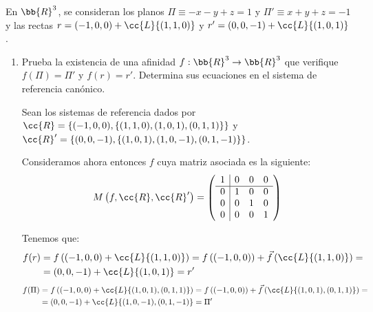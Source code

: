 \documentclass[12pt]{article}
\begin{document}
    \begin{ejercicio}[2.5 puntos]
        En $\bb{R}^3$, se consideran los planos $\Pi\equiv -x-y+z=1$ y $\Pi'\equiv x+y+z=-1$
        y las rectas $r=(-1,0,0) + \cc{L}\{(1,1,0)\}$ y $r'=(0,0,-1) + \cc{L}\{(1,0,1)\}$.
        \begin{enumerate}
            \item Prueba la existencia de una afinidad $f:\bb{R}^3 \to \bb{R}^3$ que verifique $f(\Pi)=\Pi'$ y $f(r)=r'$.
            Determina sus ecuaciones en el sistema de referencia canónico.

            Sean los sistemas de referencia dados por $\cc{R}=\{(-1,0,0), \{(1,1,0), (1,0,1), (0,1,1)\}\}$
            y $\cc{R}'=\{(0,0,-1), \{(1,0,1), (1,0,-1), (0,1,-1)\}\}$.

            Consideramos ahora entonces $f$ cuya matriz asociada es la siguiente:
            \begin{equation*}
                M\left(f, \cc{R}, \cc{R}'\right) = \left(
                    \begin{array}{c|ccc}
                        1 & 0 & 0 & 0 \\
                        \hline
                        0 & 1 & 0 & 0 \\
                        0 & 0 & 1 & 0 \\
                        0 & 0 & 0 & 1
                    \end{array}
                \right)
            \end{equation*}

            Tenemos que:
            \begin{align*}
                f(r)&
                = f\left((-1,0,0) + \cc{L}\{(1,1,0)\}\right)
                = f\left((-1,0,0)\right) + \vec{f}\left(\cc{L}\{(1,1,0)\}\right)
                =\\&= (0,0,-1) + \cc{L}\{(1,0,1)\} = r'
            \end{align*}
            \begin{align*}
                f(\Pi)&
                = f\left((-1,0,0) + \cc{L}\{(1,0,1), (0,1,1)\}\right)
                = f\left((-1,0,0)\right) + \vec{f}\left(\cc{L}\{(1,0,1), (0,1,1)\}\right)
                =\\&= (0,0,-1) + \cc{L}\{(1,0,-1), (0,1,-1)\} = \Pi'
            \end{align*}


\end{enumerate}
\end{ejercicio}
\end{document}
